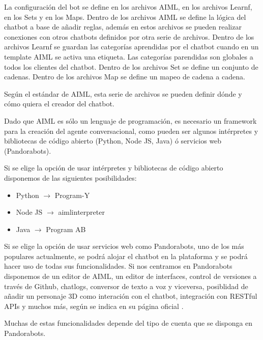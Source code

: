 La configuración del bot se define en los archivos AIML, en los archivos Learnf, en los Sets y en los Maps. Dentro de los archivos AIML se define la lógica del chatbot a base de añadir reglas, además en estos archivos se pueden realizar conexiones con otros chatbots definidos por otra serie de archivos. Dentro de los archivos Learnf se guardan las categorías aprendidas por el chatbot cuando en un template AIML se activa una etiqueta. Las categorías parendidas son globales a todos los clientes del chatbot. Dentro de los archivos Set se define un conjunto de cadenas. Dentro de los archivos Map se define un mapeo de cadena a cadena.

Según el estándar de AIML, esta serie de archivos se pueden definir dónde y cómo quiera el creador del chatbot.

Dado que AIML es sólo un lenguaje de programación, es necesario un framework para la creación del agente conversacional, como pueden ser algunos intérpretes y bibliotecas de código abierto (Python, Node JS, Java) ó servicios web (Pandorabots).

Si se elige la opción de usar intérpretes y bibliotecas de código abierto disponemos de las siguientes posibilidades:

\begin{itemize}
    \item Python $\rightarrow$ Program-Y
    \item Node JS $\rightarrow$ aimlinterpreter
    \item Java $\rightarrow$ Program AB
\end{itemize}

Si se elige la opción de usar servicios web como Pandorabots, uno de los más populares actualmente, se podrá alojar el chatbot en la plataforma y se podrá hacer uso de todas sus funcionalidades. Si nos centramos en Pandorabots disponemos de un editor de AIML, un editor de interfaces, control de versiones a través de Github, chatlogs, conversor de texto a voz y viceversa, posiblidad de añadir un personaje 3D como interación con el chatbot, integración con RESTful APIs y muchos más, según se indica en su página oficial \cite{RefWorks:RefID:14-pandorabots:}.

Muchas de estas funcionalidades depende del tipo de cuenta que se disponga en Pandorabots.

\newpage

